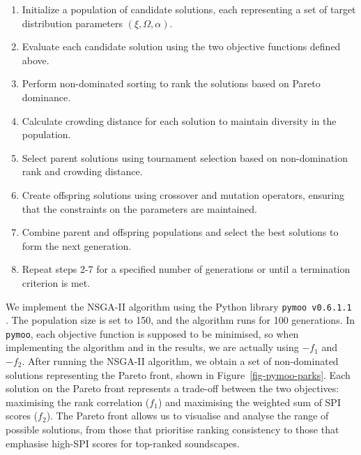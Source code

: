 \documentclass[
  authoryear,
  preprint,
  3p]{elsarticle}
\providecommand{\tightlist}{%
  \setlength{\itemsep}{0pt}\setlength{\parskip}{0pt}}\usepackage{longtable,booktabs,array}
\begin{document}
\begin{enumerate}
\def\labelenumi{\arabic{enumi}.}
\tightlist
\item
  Initialize a population of candidate solutions, each representing a
  set of target distribution parameters \((\xi, \Omega, \alpha)\).
\item
  Evaluate each candidate solution using the two objective functions
  defined above.
\item
  Perform non-dominated sorting to rank the solutions based on Pareto
  dominance.
\item
  Calculate crowding distance for each solution to maintain diversity in
  the population.
\item
  Select parent solutions using tournament selection based on
  non-domination rank and crowding distance.
\item
  Create offspring solutions using crossover and mutation operators,
  ensuring that the constraints on the parameters are maintained.
\item
  Combine parent and offspring populations and select the best solutions
  to form the next generation.
\item
  Repeat steps 2-7 for a specified number of generations or until a
  termination criterion is met.
\end{enumerate}

We implement the NSGA-II algorithm using the Python library
\texttt{pymoo\ v0.6.1.1} \citep{pymoo}. The population size is set to
150, and the algorithm runs for 100 generations. In \texttt{pymoo}, each
objective function is supposed to be minimised, so when implementing the
algorithm and in the results, we are actually using \(-f_1\) and
\(-f_2\). After running the NSGA-II algorithm, we obtain a set of
non-dominated solutions representing the Pareto front, shown in
Figure~\ref{fig-pymoo-parks}. Each solution on the Pareto front
represents a trade-off between the two objectives: maximising the rank
correlation (\(f_1\)) and maximising the weighted sum of SPI scores
(\(f_2\)). The Pareto front allows us to visualise and analyse the range
of possible solutions, from those that prioritise ranking consistency to
those that emphasise high-SPI scores for top-ranked soundscapes.
\end{document}
